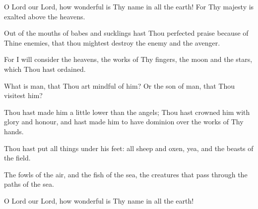 O Lord our Lord, how wonderful is Thy name in all the earth! For Thy majesty is exalted above the heavens.

Out of the mouths of babes and sucklings hast Thou perfected praise because of Thine enemies, that thou mightest destroy the enemy and the avenger.

For I will consider the heavens, the works of Thy fingers, the moon and the stars, which Thou hast ordained.

What is man, that Thou art mindful of him? Or the son of man, that Thou visitest him?

Thou hast made him a little lower than the angels; Thou hast crowned him with glory and honour, and hast made him to have dominion over the works of Thy hands.

Thou hast put all things under his feet: all sheep and oxen, yea, and the beasts of the field.

The fowls of the air, and the fish of the sea, the creatures that pass through the paths of the sea.

O Lord our Lord, how wonderful is Thy name in all the earth!
